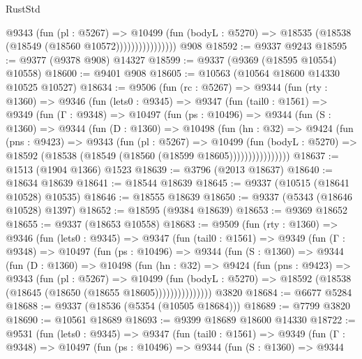 \begin{lexlean}{RustStd}
\begin{coremodule}
                        @9343
                          (fun (pl : @5267) =>
                          @10499
                            (fun (bodyL : @5270) =>
                            @18535 (@18538 (@18549 (@18560 @10572))))))))))))))))
    @908
@18592 := @9337 @9243
@18595 := @9377 (@9378 @908) @14327
@18599 := @9337 (@9369 (@18595 @10554) @10558)
@18600 := @9401 @908
@18605 := @10563 (@10564 @18600 @14330 @10525 @10527)
@18634 := @9506
    (fun (rc : @5267) =>
    @9344
      (fun (rty : @1360) =>
      @9346
        (fun (lets0 : @9345) =>
        @9347
          (fun (tail0 : @1561) =>
          @9349
            (fun (Γ : @9348) =>
            @10497
              (fun (ps : @10496) =>
              @9344
                (fun (S : @1360) =>
                @9344
                  (fun (D : @1360) =>
                  @10498
                    (fun (hn : @32) =>
                    @9424
                      (fun (pns : @9423) =>
                      @9343
                        (fun (pl : @5267) =>
                        @10499
                          (fun (bodyL : @5270) =>
                          @18592 (@18538 (@18549 (@18560 (@18599 @18605))))))))))))))))
@18637 := @1513 (@1904 @1366) @1523
@18639 := @3796 (@2013 @18637)
@18640 := @18634 @18639
@18641 := @18544 @18639
@18645 := @9337 (@10515 (@18641 @10528) @10535)
@18646 := @18555 @18639
@18650 := @9337 (@5343 (@18646 @10528) @1397)
@18652 := @18595 (@9384 @18639)
@18653 := @9369 @18652
@18655 := @9337 (@18653 @10558)
@18683 := @9509
    (fun (rty : @1360) =>
    @9346
      (fun (lets0 : @9345) =>
      @9347
        (fun (tail0 : @1561) =>
        @9349
          (fun (Γ : @9348) =>
          @10497
            (fun (ps : @10496) =>
            @9344
              (fun (S : @1360) =>
              @9344
                (fun (D : @1360) =>
                @10498
                  (fun (hn : @32) =>
                  @9424
                    (fun (pns : @9423) =>
                    @9343
                      (fun (pl : @5267) =>
                      @10499
                        (fun (bodyL : @5270) =>
                        @18592 (@18538 (@18645 (@18650 (@18655 @18605)))))))))))))))
    @3820
@18684 := @6677 @5284
@18688 := @9337 (@18536 (@5354 (@10505 @18684)))
@18689 := @7799 @3820
@18690 := @10561 @18689
@18693 := @9399 @18689 @18600 @14330
@18722 := @9531
    (fun (lets0 : @9345) =>
    @9347
      (fun (tail0 : @1561) =>
      @9349
        (fun (Γ : @9348) =>
        @10497
          (fun (ps : @10496) =>
          @9344
            (fun (S : @1360) =>
            @9344

\end{coremodule}
\end{lexlean}
